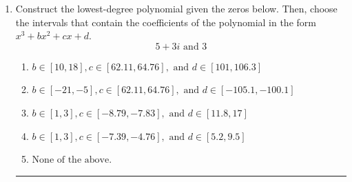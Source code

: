 \documentclass[14pt]{extbook}
\newcommand{\litem}[1]{\item#1\hspace*{-1cm}\rule{\textwidth}{0.4pt}}
\begin{document}
\begin{enumerate}
\litem{
Construct the lowest-degree polynomial given the zeros below. Then, choose the intervals that contain the coefficients of the polynomial in the form $x^3+bx^2+cx+d$.\[ 5 + 3 i \text{ and } 3 \]\begin{enumerate}[label=\Alph*.]
\item \( b \in [10, 18], c \in [62.11, 64.76], \text{ and } d \in [101, 106.3] \)
\item \( b \in [-21, -5], c \in [62.11, 64.76], \text{ and } d \in [-105.1, -100.1] \)
\item \( b \in [1, 3], c \in [-8.79, -7.83], \text{ and } d \in [11.8, 17] \)
\item \( b \in [1, 3], c \in [-7.39, -4.76], \text{ and } d \in [5.2, 9.5] \)
\item \( \text{None of the above.} \)


\end{enumerate}}
\end{enumerate}
\end{document}
